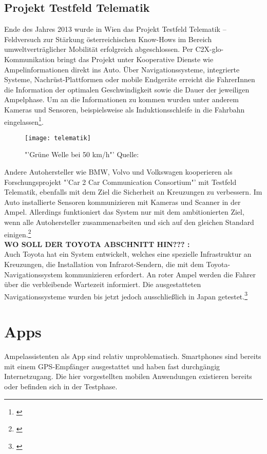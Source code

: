 \subsection{Projekt Testfeld Telematik}
Ende des Jahres 2013 wurde in Wien das Projekt Testfeld Telematik -- Feldversuch zur Stärkung österreichischen Know-Hows im Bereich umweltverträglicher Mobilität erfolgreich abgeschlossen. Per \gls{C2X-glo}-Kommunikation bringt das Projekt unter Kooperative Dienste wie Ampelinformationen direkt ins Auto. Über Navigationssysteme, integrierte Systeme, Nachrüst-Plattformen oder mobile Endgeräte erreicht die FahrerInnen die Information der optimalen Geschwindigkeit sowie die Dauer der jeweiligen Ampelphase. Um an die Informationen zu kommen wurden unter anderem Kameras und Sensoren, beispielsweise als Induktionsschleife in die Fahrbahn eingelassen\footnote{\cite{Siemens}}.
\begin{figure}[H]
    \centering
    \texttt{[image: telematik]}
    \label{fig:telematik}
    \caption[Projekt Testfeld-Telematik Ampelinformation]{"'Grüne Welle bei 50 km/h"'  Quelle: \cite{Telematik}}
\end{figure}
Andere Autohersteller wie \gls{BMW}, Volvo und Volkswagen kooperieren als Forschungsprojekt "'Car 2 Car Communication Consortium"' mit Testfeld Telematik, ebenfalls mit dem Ziel die Sicherheit an Kreuzungen zu verbessern. Im Auto installierte Sensoren kommunizieren mit Kameras und Scanner in der Ampel. Allerdings funktioniert das System nur mit dem ambitionierten Ziel, wenn alle Autohersteller zusammenarbeiten und sich auf den gleichen Standard einigen.\footnote{\cite{Siemens}}
\\ \textbf{WO SOLL DER TOYOTA ABSCHNITT HIN??? :} \\
Auch Toyota hat ein System entwickelt, welches eine spezielle Infrastruktur an Kreuzungen, die Installation von Infrarot-Sendern, die mit dem Toyota-Navigationssystem kommunizieren erfordert. An roter Ampel werden die Fahrer über die verbleibende Wartezeit informiert. Die ausgestatteten Navigationssysteme wurden bis jetzt jedoch ausschließlich in Japan getestet.\footnote{\cite{Toyota}}\\
%
%
\section{Apps}
Ampelassistenten als App sind relativ unproblematisch. Smartphones sind bereits mit einem \gls{GPS}-Empfänger ausgestattet und haben fast durchgängig Internetzugang. Die hier vorgestellten mobilen Anwendungen existieren bereits oder befinden sich in der Testphase.
